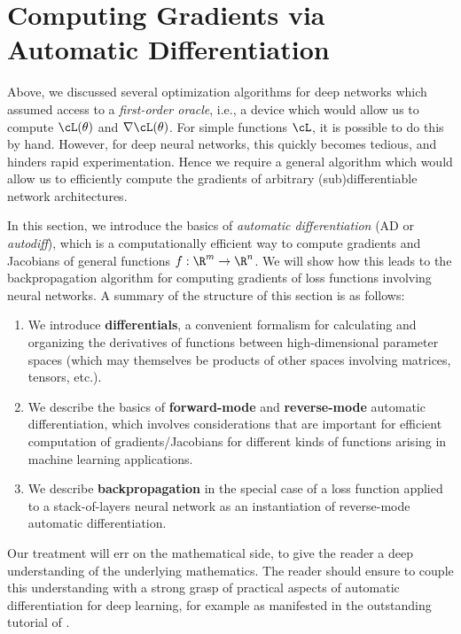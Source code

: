 \documentclass[../../book-main.tex]{subfiles}
\begin{document}
\section{Computing Gradients via Automatic Differentiation}\label{sec:autodiff}

Above, we discussed several optimization algorithms for deep networks which assumed access to a \textit{first-order oracle}, i.e., a device which would allow us to compute \(\cL(\theta)\) and \(\nabla \cL(\theta)\).
For simple functions \(\cL\), it is possible to do this by hand.
However, for deep neural networks, this quickly becomes tedious, and hinders
rapid experimentation.
Hence we require a general algorithm which would allow us to efficiently compute the gradients of arbitrary (sub)differentiable network architectures. 

In this section, we introduce the basics of \textit{automatic differentiation}
(AD or \textit{autodiff}), which is a computationally efficient way to compute
gradients and Jacobians of general functions $f: \R^m \to \R^n$. We will show
how this leads to the backpropagation algorithm for computing gradients of loss
functions involving neural networks.
A summary of the structure of this section is as follows:
\begin{enumerate}
    \item We introduce \textbf{differentials}, a convenient formalism for
        calculating and organizing the derivatives of functions between
        high-dimensional parameter spaces (which may themselves be products of
        other spaces involving matrices, tensors, etc.).
    \item We describe the basics of \textbf{forward-mode} and
        \textbf{reverse-mode} automatic differentiation, which involves
        considerations that are important for efficient computation of
        gradients/Jacobians for different kinds of functions arising in machine
        learning applications.
    \item We describe \textbf{backpropagation} in the special case of a loss
        function applied to a stack-of-layers neural network as an instantiation
        of reverse-mode automatic differentiation.
\end{enumerate}

Our treatment will err on the mathematical side, to give the reader a deep
understanding of the underlying mathematics. The reader should ensure to couple
this understanding with a strong grasp of practical aspects of automatic
differentiation for deep learning, for example as manifested in the outstanding
tutorial of \textcite{karpathy-micrograd}.
\end{document}
